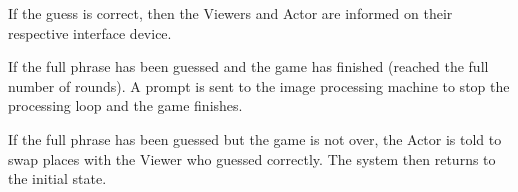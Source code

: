 \documentclass{article}
\begin{document}
\begin{itemize}
	\subitem [B2] If the guess is correct, then the Viewers and Actor are informed on their respective interface device.
	
	\subitem [B3] If the full phrase has been guessed and the game has finished (reached the full number of rounds). A prompt is sent to the image processing machine to stop the processing loop and the game finishes.
	
	\subitem [B4] If the full phrase has been guessed but the game is not over, the Actor is told to swap places with the Viewer who guessed correctly. The system then returns to the initial state.
	
	
\end{itemize}
\end{document}
